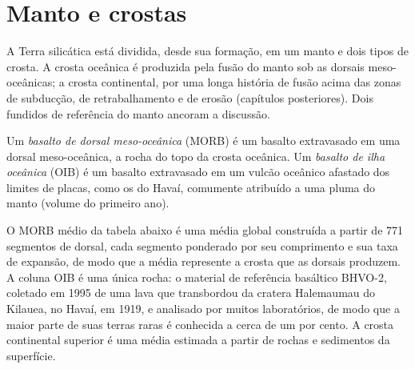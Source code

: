 \section{Manto e crostas}

A Terra silicática está dividida, desde sua formação, em um manto e dois
tipos de crosta. A crosta oceânica é produzida pela fusão do manto sob as
dorsais meso-oceânicas; a crosta continental, por uma longa história de fusão acima das
zonas de subducção, de retrabalhamento e de erosão (capítulos posteriores). Dois fundidos de referência
do manto ancoram a discussão.

\begin{definition}
\label{def:b2:elements-in-the-earth:morb-oib}
Um \emph{basalto de dorsal meso-oceânica} (MORB) é um basalto
extravasado em uma dorsal meso-oceânica, a rocha do topo da crosta oceânica. Um
\emph{basalto de ilha oceânica} (OIB) é um basalto extravasado
em um vulcão oceânico afastado dos limites de placas, como os do Havaí,
comumente atribuído a uma pluma do manto (volume do primeiro ano).
\end{definition}

O MORB médio da tabela abaixo é uma média global construída a partir de 771 segmentos
de dorsal, cada segmento ponderado por seu comprimento e sua taxa de expansão, de modo que a
média represente a crosta que as dorsais produzem. A coluna OIB
é uma única rocha: o material de referência basáltico BHVO-2, coletado em 1995
de uma lava que transbordou da cratera Halemaumau do Kilauea, no Havaí, em 1919,
e analisado por muitos laboratórios, de modo que a maior parte de suas terras raras é conhecida a
cerca de um por cento. A crosta continental superior é uma média estimada a partir de
rochas e sedimentos da superfície.


